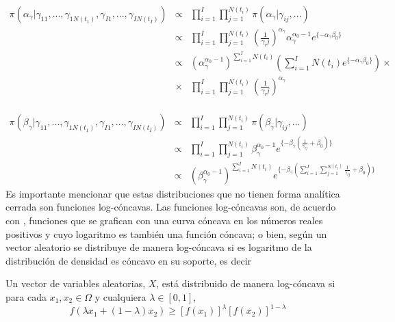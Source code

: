 \\
\begin{eqnarray*}
\pi(\alpha_\gamma|\gamma_{11},...,\gamma_{1N(t_1)},\gamma_{I1},...,\gamma_{IN(t_I)})&\propto & \prod_{i=1}^I \prod_{j=1}^{N(t_i)} \pi(\alpha_\gamma|\gamma_{ij},...)\\
&\propto & \prod_{i=1}^I \prod_{j=1}^{N(t_i)} (\frac{1}{\gamma_ij})^{\alpha_\gamma} \alpha_\gamma^{\alpha_0-1}e^{\{-\alpha_\gamma\beta_0\}}\\
&\propto & (\alpha_\gamma^{\alpha_0-1})^{\sum_{i=1}^I N(t_i)} (\sum_{i=1}^I N(t_i) e^{\{-\alpha_\gamma \beta_0\}}) \times \\
&\times & \prod_{i=1}^I \prod_{j=1}^{N(t_i)}(\frac{1}{\gamma_ij})^{\alpha_\gamma}
\end{eqnarray*}
\\
\begin{eqnarray*}
\pi(\beta_\gamma|\gamma_{11},...,\gamma_{1N(t_1)},\gamma_{I1},...,\gamma_{IN(t_I)})&\propto & \prod_{i=1}^I \prod_{j=1}^{N(t_i)} \pi(\beta_\gamma|\gamma_{ij},...)\\
&\propto & \prod_{i=1}^I \prod_{j=1}^{N(t_i)} \beta_\gamma^{\alpha_0-1}e^{\{-\beta_\gamma(\frac{1}{\gamma_{ij}}+\beta_0)\}}\\
&\propto & (\beta_\gamma^{\alpha_0-1})^{\sum_{i=1}^I N(t_i)} e^{\{-\beta_\gamma(\sum_{i=1}^I \sum_{j=1}^{N(t_i)}\frac{1}{\gamma_{ij}}+\beta_0)\}}
\end{eqnarray*}
Es importante mencionar que estas distribuciones que no tienen forma anal\'itica cerrada son funciones log-c\'oncavas. Las funciones log-c\'oncavas son, de acuerdo con \cite{bagnoli2005log}, funciones que se grafican con una curva c\'oncava en los n\'umeros reales positivos y cuyo logaritmo es tambi\'en una funci\'on c\'oncava; o bien, seg\'un \cite{an1996log} un vector aleatorio se distribuye de manera log-c\'oncava  si es logaritmo de la distribuci\'on de densidad es c\'oncavo en su soporte, es decir
\begin{defi}
Un vector de variables aleatorias, $X$, est\'a distribuido de manera log-c\'oncava si para cada $x_1, x_2 \in \Omega$ y cualquiera $\lambda \in [0,1]$,
\[f(\lambda x_1+(1-\lambda)x_2) \geq [f(x_1)]^\lambda [f(x_2)]^{1-\lambda}\] 
\end{defi}

